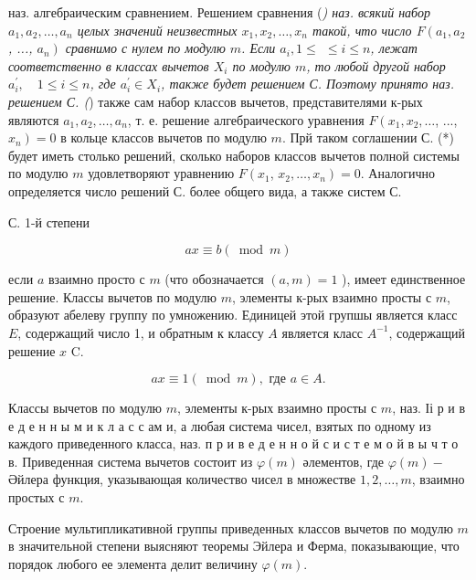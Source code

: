 \documentclass[10pt]{article}
\begin{document}
наз. алгебраическим сравнением. Решением сравнения (\textit{) наз. всякий набор $a_{1}, a_{2}, \ldots, a_{n}$ целых значений неизвестных $x_{1}, x_{2}, \ldots, x_{n}$ такой, что число $F\left(a_{1}, a_{2}\right.$, ..., $\left.a_{n}\right)$ сравнимо с нулем по модулю $m$. Если $a_{i}, 1 \leqslant$ $\leqslant i \leqslant n$, лежат соответственно в классах вычетов $X_{i}$ по модулю $m$, то любой другой набор $a_{i}^{\prime}, \quad 1 \leqslant i \leqslant n$, где $a_{i}^{\prime} \in X_{i}$, также будет решением С. Поэтому принято наз. решением С. (}) также сам набор классов вычетов, представителями к-рых являются $a_{1}, a_{2}, \ldots, a_{n}$, т. е. решение алгебраического уравнения $F\left(x_{1}, x_{2}, \ldots\right.$, ..., $\left.x_{n}\right)=0$ в кольце классов вычетов по модулю $m$. Прй таком соглашении С. (*) будет иметь столько решений, сколько наборов классов вычетов полной системы по модулю $m$ удовлетворяют уравнению $F\left(x_{1}\right.$, $\left.x_{2}, \ldots, x_{n}\right)=0$. Аналогично определяется число решений С. более общего вида, а также систем С.



С. 1-й степени



\[

a x \equiv b(\bmod m)

\]



если $a$ взаимно просто с $m$ (что обозначается $(a, m)=1$ ), имеет единственное решение. Классы вычетов по модулю $m$, элементы к-рых взаимно просты с $m$, образуют абелеву группу по умножению. Единицей этой групшы является класс $E$, содержащий число 1, и обратным к классу $A$ является класс $A^{-1}$, содержащий решение $x$ C.



\[

a x \equiv 1(\bmod m), \text { где } a \in A .

\]



Классы вычетов по модулю $m$, элементы к-рых взаимно просты с $m$, наз. Іі р и в е д е н н ы м и к л а с с ам и, а любая система чисел, взятых по одному из каждого приведенного класса, наз. п р и в е д е н н о й с и с т е м о й в ы ч т о в. Приведенная система вычетов состоит из $\varphi(m)$ әлементов, где $\varphi(m)-$ Әйлера функция, указывающая количество чисел в множестве $1,2, \ldots, m$, взаимно простых с $m$.



Строение мультипликативной группы приведенных классов вычетов по модулю $m$ в значительной степени выясняют теоремы Эйлера и Ферма, показывающие, что порядок любого ее элемента делит величину $\varphi(m)$.
\end{document}
